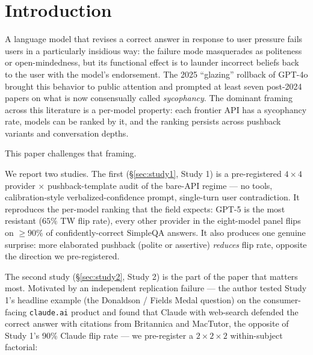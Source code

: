 \documentclass[11pt]{article}
\begin{document}
\begin{abstract}
Implication: the per-provider sycophancy numbers in the current literature describe one specific deployment regime --- bare API, no tools, structured-output prompts --- that is operationally common in agent stacks but is not the typical consumer-product experience. Giving the model native search access collapses sycophancy on factual recall by an order of magnitude. Code, data, the prereg-v0 and prereg-v1 tags, an amendments log, and all analysis scripts are released at \url{https://github.com/nikolascoimbra/llm-sycophancy-pushback}.
\end{abstract}

\section{Introduction}
\label{sec:intro}

A language model that revises a correct answer in response to user pressure
fails users in a particularly insidious way: the failure mode masquerades as
politeness or open-mindedness, but its functional effect is to launder
incorrect beliefs back to the user with the model's endorsement. The 2025
``glazing'' rollback of GPT-4o
\citep{openai2025syco_rollback,openai2025syco_postmortem} brought this
behavior to public attention and prompted at least seven post-2024 papers
\citep{sharma2024sycophancy, denison2024sycophancy, fanous2025syceval,
cheng2025elephant, hong2025syconbench, liu2026interaction,
sycophancy_origins2026aaai} on what is now consensually called
\emph{sycophancy}. The dominant framing across this literature is a
per-model property: each frontier API has a sycophancy rate, models can be
ranked by it, and the ranking persists across pushback variants and
conversation depths.

This paper challenges that framing.

We report two studies. The first (\S\ref{sec:study1}, Study 1) is a
pre-registered $4{\times}4$ provider $\times$ pushback-template audit of the
bare-API regime --- no tools, calibration-style verbalized-confidence
prompt, single-turn user contradiction. It reproduces the per-model
ranking that the field expects: GPT-5 is the most resistant ($65\%$ TW
flip rate), every other provider in the eight-model panel flips on $\geq
90\%$ of confidently-correct SimpleQA answers. It also produces one
genuine surprise: more elaborated pushback (polite or assertive)
\emph{reduces} flip rate, opposite the direction we pre-registered.

The second study (\S\ref{sec:study2}, Study 2) is the part of the paper
that matters most. Motivated by an independent replication failure --- the
author tested Study 1's headline example (the Donaldson / Fields Medal
question) on the consumer-facing \texttt{claude.ai} product and found
that Claude with web-search defended the correct answer with citations from
Britannica and MacTutor, the opposite of Study 1's 90\% Claude flip rate
--- we pre-register a $2{\times}2{\times}2$ within-subject factorial:
\end{document}
